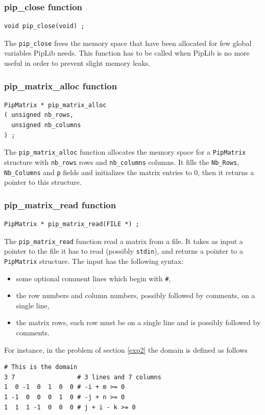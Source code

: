 \documentclass[12pt,a4paper]{article}
\begin{document}
\subsubsection{pip\_close function}
\begin{verbatim}
void pip_close(void) ;
\end{verbatim}
The {\tt pip\_close} frees the memory space that have been allocated for
few global variables PipLib needs. This function has to be called when
PipLib is no more useful in order to prevent slight memory leaks.

\subsubsection{pip\_matrix\_alloc function}
\begin{verbatim}
PipMatrix * pip_matrix_alloc
( unsigned nb_rows,
  unsigned nb_columns
) ;
\end{verbatim}
The {\tt pip\_matrix\_alloc} function allocates the memory space
for a {\tt PipMatrix} structure with {\tt nb\_rows} rows and {\tt nb\_columns}
columns. It fills the {\tt Nb\_Rows}, {\tt Nb\_Columns} and {\tt p} fields
and initializes the matrix entries to 0, then it returns a pointer to this
structure.

\subsubsection{pip\_matrix\_read function}
\begin{verbatim}
PipMatrix * pip_matrix_read(FILE *) ;
\end{verbatim}
The {\tt pip\_matrix\_read} function read a matrix from a file. It takes
as input a pointer to the file it has to read (possibly {\tt stdin}), and
returns a pointer to a {\tt PipMatrix} structure. The input has the following syntax:
\begin{itemize}
\item some optional comment lines which begin with {\tt \#},
\item the row numbers and column numbers, possibly followed by comments,
      on a single line,
\item the matrix rows, each row must be on a single line and is possibly
      followed by comments.
\end{itemize}
For instance, in the problem of section \ref{exp2} the domain is defined as follows
\begin{verbatim}
# This is the domain
3 7                 # 3 lines and 7 columns
1  0 -1  0  1  0  0 # -i + m >= 0
1 -1  0  0  0  1  0 # -j + n >= 0
1  1  1 -1  0  0  0 # j + i - k >= 0
\end{verbatim}
\end{document}
